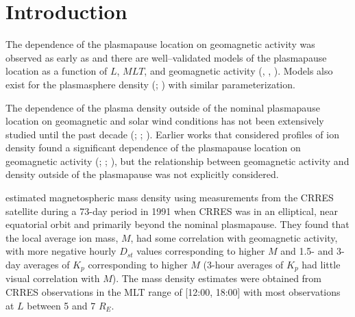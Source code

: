 \documentclass[12pt]{article}
\begin{document}

\section{Introduction}


The dependence of the plasmapause location on geomagnetic activity was observed as early as \cite{Carpenter1966} and there are well--validated models of the plasmapause location as a function of $L$, $MLT$, and geomagnetic activity (\cite{LemaireEarthsPlasmasphere}, \cite{Moldwin2002ModelPlasmapause}, \cite{OBrien2003EmpiricalPlasmapause}).  Models also exist for the plasmasphere density (\cite{Gallagher1988EmpiricalModelPlasmasphere}; \cite{LemaireEarthsPlasmasphere}) with similar parameterization.

The dependence of the plasma density outside of the nominal plasmapause location on geomagnetic and solar wind conditions has not been extensively studied until the past decade (\cite{Takahashi2006}; \cite{Takahashi2010}; \cite{Denton2016}). Earlier works that considered profiles of ion density found a significant dependence of the plasmapause location on geomagnetic activity (\cite{Chappell1970}; \cite{Maynard1977}; \cite{Carpenter1992}), but the relationship between geomagnetic activity and density outside of the plasmapause was not explicitly considered.

\cite{Takahashi2006} estimated magnetospheric mass density using measurements from the CRRES satellite during a 73-day period in 1991 when CRRES was in an elliptical, near equatorial orbit and primarily beyond the nominal plasmapause. They found that the local average ion mass, $M$, had some correlation with geomagnetic activity, with more negative hourly $D_{st}$ values corresponding to higher $M$ and 1.5- and 3-day averages of $K_p$ corresponding to higher $M$ (3-hour averages of $K_p$ had little visual correlation with $M$). The mass density estimates were obtained from CRRES observations in the MLT range of [12:00, 18:00] with most observations at $L$ between 5 and 7 $R_E$.
\end{document}
